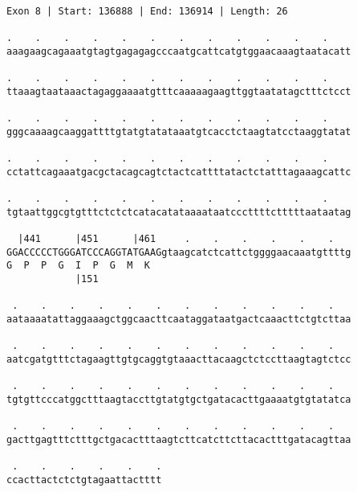 \documentclass{article}
\begin{document}
\begin{Verbatim}[fontfamily=courier]
Exon 8 | Start: 136888 | End: 136914 | Length: 26

.    .    .    .    .    .    .    .    .    .    .    .    
aaagaagcagaaatgtagtgagagagcccaatgcattcatgtggaacaaagtaatacatt

.    .    .    .    .    .    .    .    .    .    .    .    
ttaaagtaataaactagaggaaaatgtttcaaaaagaagttggtaatatagctttctcct

.    .    .    .    .    .    .    .    .    .    .    .    
gggcaaaagcaaggattttgtatgtatataaatgtcacctctaagtatcctaaggtatat

.    .    .    .    .    .    .    .    .    .    .    .    
cctattcagaaatgacgctacagcagtctactcattttatactctatttagaaagcattc

.    .    .    .    .    .    .    .    .    .    .    .    
tgtaattggcgtgtttctctctcatacatataaaataatcccttttctttttaataatag

  |441      |451      |461     .    .    .    .    .    .   
GGACCCCCTGGGATCCCAGGTATGAAGgtaagcatctcattctggggaacaaatgttttg
G  P  P  G  I  P  G  M  K                                   
            |151                                            

 .    .    .    .    .    .    .    .    .    .    .    .   
aataaaatattaggaaagctggcaacttcaataggataatgactcaaacttctgtcttaa

 .    .    .    .    .    .    .    .    .    .    .    .   
aatcgatgtttctagaagttgtgcaggtgtaaacttacaagctctccttaagtagtctcc

 .    .    .    .    .    .    .    .    .    .    .    .   
tgtgttcccatggctttaagtaccttgtatgtgctgatacacttgaaaatgtgtatatca

 .    .    .    .    .    .    .    .    .    .    .    .   
gacttgagtttctttgctgacactttaagtcttcatcttcttacactttgatacagttaa

 .    .    .    .    .    .
ccacttactctctgtagaattactttt
\end{Verbatim}
\newpage
\end{document}
